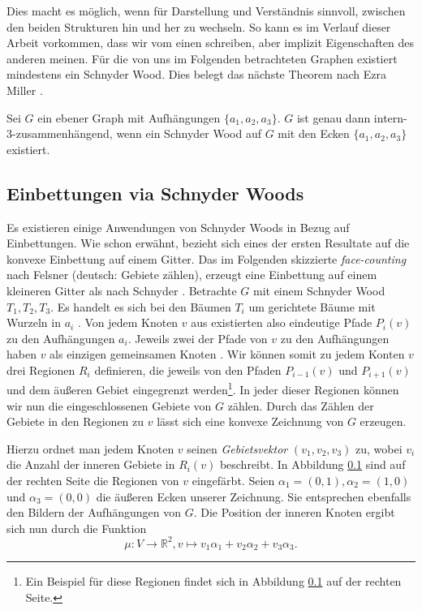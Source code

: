 Dies macht es möglich, wenn für Darstellung und Verständnis sinnvoll, zwischen den beiden Strukturen hin und her zu wechseln. So kann es im Verlauf dieser Arbeit vorkommen, dass wir vom einen schreiben, aber implizit Eigenschaften des anderen meinen. Für die von uns im Folgenden betrachteten Graphen existiert mindestens ein Schnyder Wood. Dies belegt das nächste Theorem nach Ezra Miller \cite[Theorem A]{miller02}.

\begin{theorem}
Sei $G$ ein ebener Graph mit Aufhängungen $\{a_1,a_2,a_3\}$. $G$ ist genau dann intern-3-zusammenhängend, wenn ein Schnyder Wood auf $G$ mit den Ecken $\{a_1,a_2,a_3\}$ existiert.
\end{theorem}

\subsection{Einbettungen via Schnyder Woods}\label{face_counting}

Es existieren einige Anwendungen von Schnyder Woods in Bezug auf Einbettungen. Wie schon erwähnt, bezieht sich eines der ersten Resultate auf die konvexe Einbettung auf einem Gitter. Das im Folgenden skizzierte \textit{face-counting} nach Felsner (deutsch: Gebiete zählen), erzeugt eine Einbettung auf einem kleineren Gitter als nach Schnyder \cite{felsner01}. Betrachte $G$ mit einem Schnyder Wood $T_1,T_2,T_3$. Es handelt es sich bei den Bäumen $T_i$ um gerichtete Bäume mit Wurzeln in $a_i$ \cite[Korollar 2.5]{felsner12}. Von jedem Knoten $v$ aus existierten also eindeutige Pfade $P_i(v)$ zu den Aufhängungen $a_i$. Jeweils zwei der Pfade von $v$ zu den Aufhängungen haben $v$ als einzigen gemeinsamen Knoten \cite[Lemma 2.4]{felsner12}. Wir können somit zu jedem Konten $v$ drei Regionen $R_i$ definieren, die jeweils von den Pfaden $P_{i-1}(v)$ und $P_{i+1}(v)$ und dem äußeren Gebiet eingegrenzt werden\footnote{Ein Beispiel für diese Regionen findet sich in Abbildung \ref{face_counting} auf der rechten Seite.}. In jeder dieser Regionen können wir nun die eingeschlossenen Gebiete von $G$ zählen. Durch das Zählen der Gebiete in den Regionen zu $v$ lässt sich eine konvexe Zeichnung von $G$ erzeugen.

Hierzu ordnet man jedem Knoten $v$ seinen \textit{Gebietsvektor} $(v_1,v_2,v_3)$ zu, wobei $v_i$ die Anzahl der inneren Gebiete in $R_i(v)$ beschreibt. In Abbildung \ref{face_counting} sind auf der rechten Seite die Regionen von $v$ eingefärbt. Seien $\alpha_1 = (0,1),\alpha_2 = (1,0)$ und $\alpha_3 = (0,0)$ die äußeren Ecken unserer Zeichnung. Sie entsprechen ebenfalls den Bildern der Aufhängungen von $G$. Die Position der inneren Knoten ergibt sich nun durch die Funktion 
$$\mu: V \to \mathbb{R}^2,v\mapsto v_1\alpha_1 + v_2\alpha_2+v_3\alpha_3.$$ 

